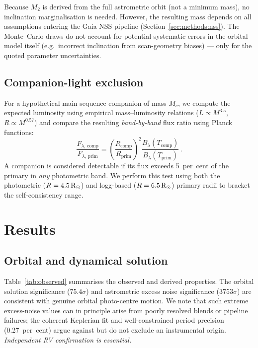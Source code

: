 \documentclass[usenatbib,fleqn]{mnras}
\newcommand{\Rsun}{{\rm R}_\odot}
\begin{document}
Because $M_2$ is derived from the full astrometric orbit (not a
minimum mass), no inclination marginalisation is needed.  However,
the resulting mass depends on all assumptions entering
the Gaia NSS pipeline (Section~\ref{sec:methods:nss}).  The
Monte~Carlo draws do not account for potential systematic errors
in the orbital model itself (e.g.\ incorrect inclination from
scan-geometry biases) --- only for the quoted parameter
uncertainties.

\subsection{Companion-light exclusion}
\label{sec:methods:companion}

For a hypothetical main-sequence companion of mass $M_c$, we
compute the expected luminosity using empirical mass--luminosity
relations ($L \propto M^{3.5}$, $R \propto M^{0.57}$) and compare
the resulting \emph{band-by-band} flux ratio using Planck functions:
\begin{equation}
\frac{F_{\lambda,\,\mathrm{comp}}}{F_{\lambda,\,\mathrm{prim}}}
= \left(\frac{R_{\mathrm{comp}}}{R_{\mathrm{prim}}}\right)^2
  \frac{B_\lambda(T_{\mathrm{comp}})}{B_\lambda(T_{\mathrm{prim}})}\,.
\label{eq:fluxratio}
\end{equation}
A companion is considered detectable if its flux exceeds 5~per~cent
of the primary in \emph{any} photometric band.  We perform this
test using both the photometric ($R = 4.5\,\Rsun$) and logg-based
($R = 6.5\,\Rsun$) primary radii to bracket the self-consistency
range.

\section{Results}
\label{sec:results}

\subsection{Orbital and dynamical solution}
\label{sec:results:orbit}

Table~\ref{tab:observed} summarises the observed and derived
properties.  The orbital solution significance ($75.4\sigma$)
and astrometric excess noise significance ($3753\sigma$) are
consistent with genuine orbital photo-centre motion.  We note
that such extreme excess-noise values can in principle arise
from poorly resolved blends or pipeline failures; the coherent
Keplerian fit and well-constrained period precision
(0.27~per~cent) argue against but do not exclude an instrumental
origin.  \emph{Independent RV confirmation is essential.}
\end{document}
